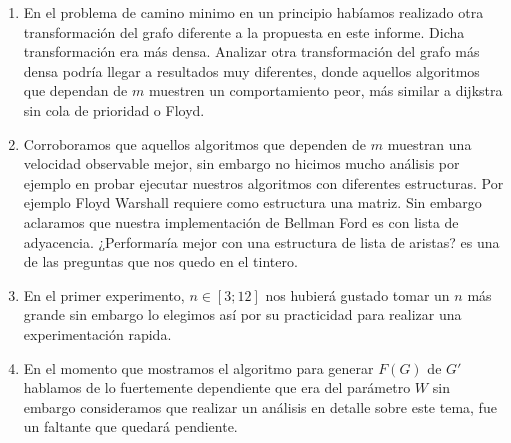 \documentclass[12pt]{article}
\begin{document}
\begin{enumerate}
	\item En el problema de camino minimo en un principio habíamos realizado otra transformación del grafo diferente a la propuesta en este informe. Dicha transformación era más densa. Analizar otra transformación del grafo más densa podría llegar a resultados muy diferentes, donde aquellos algoritmos que dependan de $m$ muestren un comportamiento peor, más similar a dijkstra sin cola de prioridad o Floyd.
	
	\item Corroboramos que aquellos algoritmos que dependen de $m$ muestran una velocidad observable mejor, sin embargo no hicimos mucho análisis por ejemplo en probar ejecutar nuestros algoritmos con diferentes estructuras. Por ejemplo Floyd Warshall requiere como estructura una matriz. Sin embargo aclaramos que nuestra implementación de Bellman Ford es con lista de adyacencia. ¿Performaría mejor con una estructura de lista de aristas? es una de las preguntas que nos quedo en el tintero.
	
	\item En el primer experimento, $n \in [3; 12]$ nos hubierá gustado tomar un $n$ más grande sin embargo lo elegimos así por su practicidad para realizar una experimentación rapida.
	
	\item En el momento que mostramos el algoritmo para generar $F(G)$ de $G'$ hablamos de lo fuertemente dependiente que era del parámetro $W$ sin embargo consideramos que realizar un análisis en detalle sobre este tema, fue un faltante que quedará pendiente.
\end{enumerate}
\end{document}
